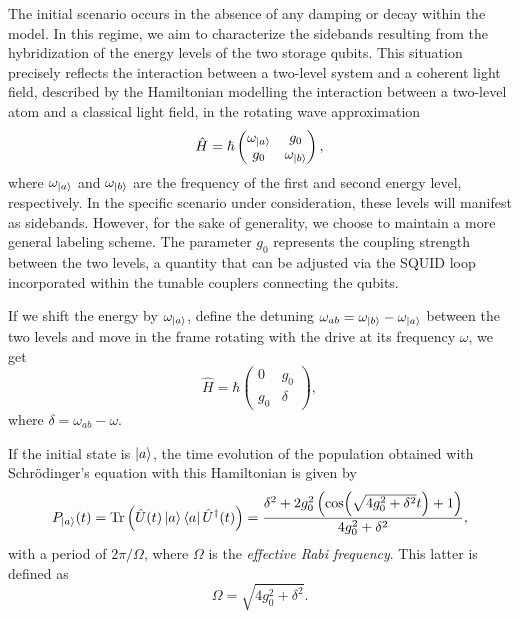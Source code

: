 The initial scenario occurs in the absence of any damping or decay within the model.
In this regime, we aim to characterize the sidebands resulting from the hybridization of the energy levels of the two storage qubits.
This situation precisely reflects the interaction between a two-level system and a coherent light field, described by the Hamiltonian modelling the interaction between a two-level atom and a classical light field, in the rotating wave approximation \cite{RWA}
\begin{equation}
    \hat{H} = \hbar
    \begin{pmatrix}
        \omega_{\ket{a}} & g_0           \\
        g_0            & \omega_{\ket{b}}
    \end{pmatrix} ,
\end{equation}
where $\omega_{\ket{a}}$ and $\omega_{\ket{b}}$ are the frequency of the first and second energy level, respectively.
In the specific scenario under consideration, these levels will manifest as sidebands.
However, for the sake of generality, we choose to maintain a more general labeling scheme.
The parameter $g_0$ represents the coupling strength between the two levels, a quantity that can be adjusted via the SQUID loop incorporated within the tunable couplers connecting the qubits.

If we shift the energy by $\omega_{\ket{a}}$, define the detuning $\omega_{ab} = \omega_{\ket{b}} - \omega_{\ket{a}}$ between the two levels and move in the frame rotating with the drive at its frequency $\omega$, we get
\begin{equation}
\label{eq:JC-Chevron}
    \hat{H} = \hbar
    \begin{pmatrix}
        0       & g_0       \\
        g_0   & \delta  
    \end{pmatrix},
\end{equation}
where $\delta = \omega_{ab} - \omega$.


If the initial state is $\ket{a}$, the time evolution of the population obtained with Schrödinger's equation with this Hamiltonian is given by \cite{Lacroix}
\begin{equation}
\label{eq:chevron}
    P_{\ket{a}} (t) = \Tr \left( \hat{U}(t) \ket{a} \bra{a} \hat{U}^\dagger (t) \right) = 
    \frac{\delta^2 + 2 g_0^2 
    \left( \cos(\sqrt{4 g_0^2 + \delta^2} t) + 1 \right)}{4 g_0^2 + \delta^2} ,
\end{equation}
with a period of $2 \pi / \Omega$, where $\Omega$ is the \emph{effective Rabi frequency}.
This latter is defined as
\begin{equation}
    \Omega = \sqrt{4 g_0^2 + \delta^2} .
\end{equation}

